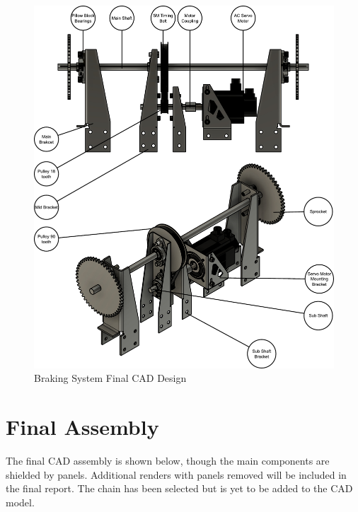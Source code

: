 \begin{figure}[ht]
    \centering
    \includegraphics[width=1\linewidth]{figs/final_design/BrakingSyst.pdf}
    \caption{Braking System Final CAD Design}
    \label{fig:brake-system-final-design}
\end{figure}

\section{Final Assembly}

The final CAD assembly is shown below, though the main components are shielded by panels. Additional renders with panels removed will be included in the final report. The chain has been selected but is yet to be added to the CAD model.

